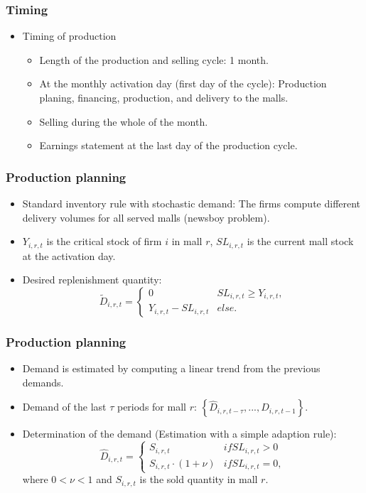 \documentclass{beamer}
\begin{document}
\frame
{
  \frametitle{Timing} 
  
  \begin{itemize}	
	\item Timing of production
	
\begin{itemize}
	\item Length of the production and selling cycle: 1 month. 
	\item At the monthly activation day (first day of the cycle): Production planing, financing, production, and delivery to the malls.
	\item Selling during the whole of the month.
	\item Earnings statement at the last day of the production cycle.
\end{itemize}
\end{itemize}


}


\frame
{
  \frametitle{Production planning} 
\begin{itemize}
	\item Standard inventory rule with stochastic demand: The firms compute different delivery volumes for all served malls (newsboy problem).
	
	\item $Y_{i,r,t}$ is the critical stock of firm $i$ in mall $r$, $SL_{i,r,t}$ is the current mall stock at the activation day.
		
	\item Desired replenishment quantity:
	\[
			\tilde{D}_{i,r,t}= \begin{cases} 0 & SL_{i,r,t}\geq Y_{i,r,t},\\
																			Y_{i,r,t} -  SL_{i,r,t} &else. 
			
			 \end{cases}
	\]
	
	
	\end{itemize}


}

\frame
{

  \frametitle{Production planning} 
\begin{itemize}

\item Demand is estimated by computing a linear trend from the previous demands.

\item Demand of the last $\tau$ periods for mall $r$: $\left\{ \hat{D}_{i,r,t-\tau},...,\hat{D}_{i,r,t-1} \right\}$.

\item Determination of the demand (Estimation with a simple adaption rule):  
		\[
				\hat{D}_{i,r,t}=\begin{cases}  S_{i,r,t} & if SL_{i,r,t}>0 \\ S_{i,r,t}\cdot (1+ \nu) & if SL_{i,r,t}=0, \end{cases}
		\]
		where $0 < \nu < 1$ and $S_{i,r,t}$ is the sold quantity in mall $r$.
\end{itemize}
  
}
\end{document}
